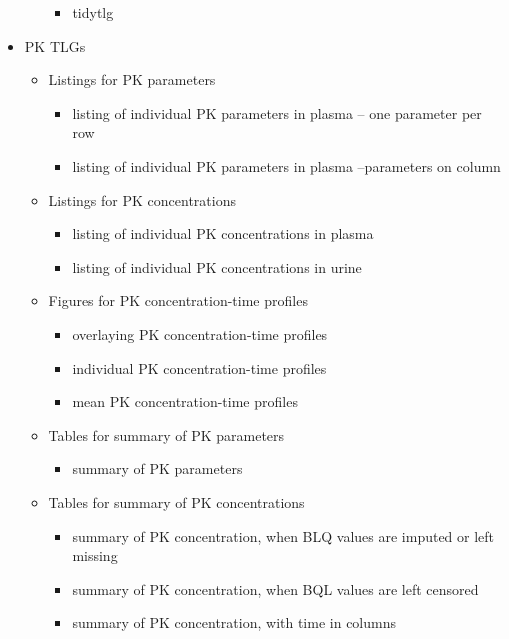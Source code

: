 \documentclass[
  letterpaper,
  DIV=11,
  numbers=noendperiod]{scrreprt}
\providecommand{\tightlist}{%
  \setlength{\itemsep}{0pt}\setlength{\parskip}{0pt}}\usepackage{longtable,booktabs,array}
\begin{document}
\begin{itemize}
\begin{itemize}
    \begin{itemize}
    \tightlist
    \item
      tidytlg
    \end{itemize}
  \end{itemize}
\item
  PK TLGs

  \begin{itemize}
  \tightlist
  \item
    Listings for PK parameters

    \begin{itemize}
    \tightlist
    \item
      listing of individual PK parameters in plasma -- one parameter per
      row
    \item
      listing of individual PK parameters in plasma --parameters on
      column
    \end{itemize}
  \item
    Listings for PK concentrations

    \begin{itemize}
    \tightlist
    \item
      listing of individual PK concentrations in plasma
    \item
      listing of individual PK concentrations in urine
    \end{itemize}
  \item
    Figures for PK concentration-time profiles

    \begin{itemize}
    \tightlist
    \item
      overlaying PK concentration-time profiles
    \item
      individual PK concentration-time profiles
    \item
      mean PK concentration-time profiles
    \end{itemize}
  \item
    Tables for summary of PK parameters

    \begin{itemize}
    \tightlist
    \item
      summary of PK parameters
    \end{itemize}
  \item
    Tables for summary of PK concentrations

    \begin{itemize}
    \tightlist
    \item
      summary of PK concentration, when BLQ values are imputed or left
      missing
    \item
      summary of PK concentration, when BQL values are left censored
    \item
      summary of PK concentration, with time in columns
    \end{itemize}
  \end{itemize}
\end{itemize}
\end{document}
